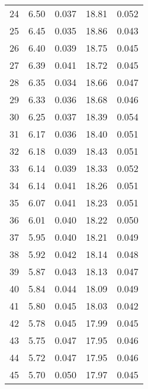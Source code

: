\begin{table}
\begin{tabular}{c|ll|ll}
24 & 6.50 & 0.037 & 18.81 & 0.052 \\
25 & 6.45 & 0.035 & 18.86 & 0.043 \\
26 & 6.40 & 0.039 & 18.75 & 0.045 \\
27 & 6.39 & 0.041 & 18.72 & 0.045 \\
28 & 6.35 & 0.034 & 18.66 & 0.047 \\
29 & 6.33 & 0.036 & 18.68 & 0.046 \\
30 & 6.25 & 0.037 & 18.39 & 0.054 \\
31 & 6.17 & 0.036 & 18.40 & 0.051 \\
32 & 6.18 & 0.039 & 18.43 & 0.051 \\
33 & 6.14 & 0.039 & 18.33 & 0.052 \\
34 & 6.14 & 0.041 & 18.26 & 0.051 \\
35 & 6.07 & 0.041 & 18.23 & 0.051 \\
36 & 6.01 & 0.040 & 18.22 & 0.050 \\
37 & 5.95 & 0.040 & 18.21 & 0.049 \\
38 & 5.92 & 0.042 & 18.14 & 0.048 \\
39 & 5.87 & 0.043 & 18.13 & 0.047 \\
40 & 5.84 & 0.044 & 18.09 & 0.049 \\
41 & 5.80 & 0.045 & 18.03 & 0.042 \\
42 & 5.78 & 0.045 & 17.99 & 0.045 \\
43 & 5.75 & 0.047 & 17.95 & 0.046 \\
44 & 5.72 & 0.047 & 17.95 & 0.046 \\
45 & 5.70 & 0.050 & 17.97 & 0.045 \\
               \hline
        \end{tabular}
    \end{table}
    \clearpage

